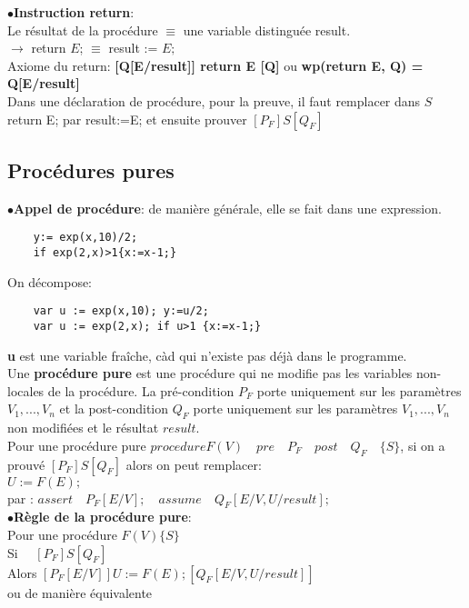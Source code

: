 $\bullet$\textbf{Instruction return}: \\Le résultat de la procédure $\equiv$ une variable distinguée result.\\
$\rightarrow$ return $E$; $\equiv$ result := $E;$\\
Axiome du return: \textbf{[Q[E/result]] return E [Q]} ou \textbf{wp(return E, Q) = Q[E/result]}
\\

Dans une déclaration de procédure, pour la preuve, il faut remplacer dans $S$ return E; par result:=E; et ensuite prouver $[P_F]S[Q_F]$
\subsection{Procédures pures}
$\bullet$\textbf{Appel de procédure}: de manière générale, elle se fait dans une expression.
\begin{lstlisting}
    y:= exp(x,10)/2;
    if exp(2,x)>1{x:=x-1;}
\end{lstlisting}
On décompose:
\begin{lstlisting}
    var u := exp(x,10); y:=u/2;
    var u := exp(2,x); if u>1 {x:=x-1;}
\end{lstlisting}
\textbf{u} est une variable fraîche, càd qui n'existe pas déjà dans le programme.\\

Une\textbf{ procédure pure} est une procédure qui ne modifie pas les variables non-locales de la procédure. La pré-condition $P_F$ porte uniquement sur les paramètres $V_1,...,V_n$ et la post-condition $Q_F$ porte uniquement sur les paramètres  $V_1,...,V_n$ non modifiées et le résultat $result$.\\

Pour une procédure pure $procedure F(V) \quad pre \quad P_F \quad post \quad Q_F \quad \{S\}$, si on a prouvé $[P_F] S [Q_F]$ alors on peut remplacer:\\
$U:=F(E);$\\
par : $assert \quad P_F[E/V]; \quad assume \quad Q_F[E/V,U/result];$\\

$\bullet$\textbf{Règle de la procédure pure}:\\

Pour une procédure $F(V) \{S\}$\\
Si $\quad  [P_F]S[Q_F]$\\
Alors $[P_F[E/V]]U:=F(E);[Q_F[E/V,U/result]]$\\

ou de manière équivalente\\

